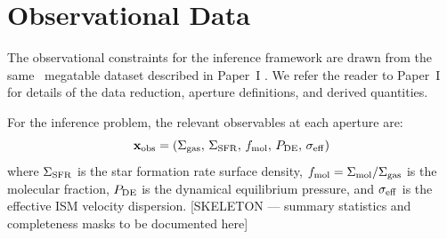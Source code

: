 \section{Observational Data}
\label{sec:data}

The observational constraints for the inference framework are drawn from the same
\PHANGS\ megatable dataset described in Paper~I \citep[Kim et al., in prep.;][]{2022AJ....164...43S,2023ApJ...945L..19S}. We refer the reader to Paper~I for
details of the data reduction, aperture definitions, and derived quantities.

For the inference problem, the relevant observables at each aperture are:
\begin{equation}
\mathbf{x}_{\rm obs} = (\Sigma_{\rm gas},\, \Sigma_{\rm SFR},\, f_{\rm mol},\, P_{\rm DE},\, \sigma_{\rm eff})
\end{equation}
where $\Sigma_{\rm SFR}$ is the star formation rate surface density, $f_{\rm mol} = \Sigma_{\rm mol}/\Sigma_{\rm gas}$ is
the molecular fraction, $P_{\rm DE}$ is the dynamical equilibrium pressure, and $\sigma_{\rm eff}$
is the effective ISM velocity dispersion. [SKELETON --- summary statistics and
completeness masks to be documented here]
